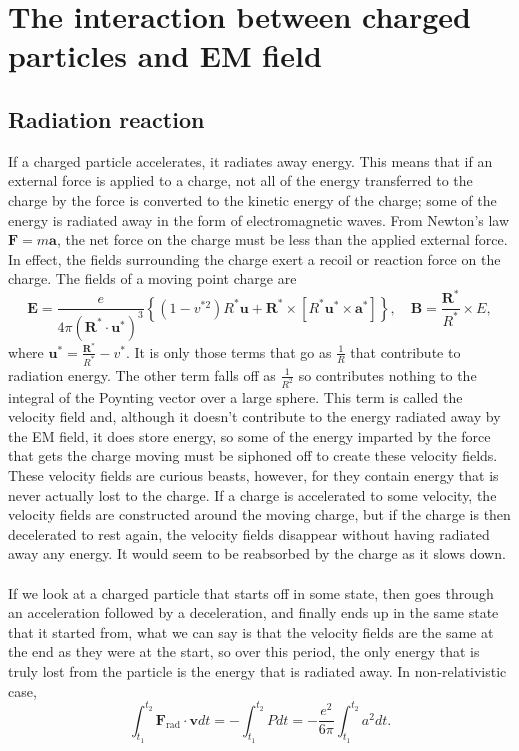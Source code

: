 \section{The interaction between charged particles and EM field}
\subsection{Radiation reaction}
If a charged particle accelerates, it radiates away energy. This means that if an external force is applied to a charge, not all of the energy transferred to the charge by the force is converted to the kinetic energy of the charge; some of the energy is radiated away in the form of electromagnetic waves.  From Newton's law $\bm{F}=m\bm{a}$, the net force on the charge must be less than the applied external force. In effect, the fields surrounding the charge exert a recoil or reaction force on the charge.
The fields of a moving point charge are
\[\bm{E} = \frac{e}{4\pi(\bm{R}^*\cdot\bm{u}^*)^3}\left\{(1-v^{*2})R^*\bm{u} + \bm{R}^* \times [R^*\bm{u}^* \times \bm{a}^*]\right\} , \quad \bm{B} = \frac{\bm{R}^*}{R^*}\times E,\]
where $\bm{u}^* = \frac{\bm{R}^*}{R^*}-v^*$.
It is only those terms that go as $\frac{1}{R}$ that contribute to radiation energy. The other term falls off as $\frac{1}{R^2}$ so contributes nothing to the integral of the Poynting vector over a large sphere. This term is called the velocity field and, although it doesn't contribute to the energy radiated away by the EM field, it does store energy, so some of the energy imparted by the force that gets the charge moving must be siphoned off to create these velocity fields. These velocity fields are curious beasts, however, for they contain energy that is never actually lost to the charge. If a charge is accelerated to some velocity, the velocity fields are constructed around the moving charge, but if the charge is then decelerated to rest again, the velocity fields disappear without having radiated away any energy. It would seem to be reabsorbed by the charge as it slows down. 
\\ \\
If we look at a charged particle that starts off in some state, then goes through an acceleration followed by a deceleration, and finally ends up in the same state that it started from, what we can say is that the velocity fields are the same at the end as they were at the start, so over this period, the only energy that is truly lost from the particle is the energy that is radiated away. In non-relativistic case,
\[\int_{t_{1}}^{t_{2}}\bm{F}_{\mathrm{rad}}\cdot\bm{v}dt = -\int_{t_{1}}^{t_{2}}Pdt = -\frac{e^{2}}{6\pi }\int_{t_{1}}^{t_{2}}a^{2}dt .\]
